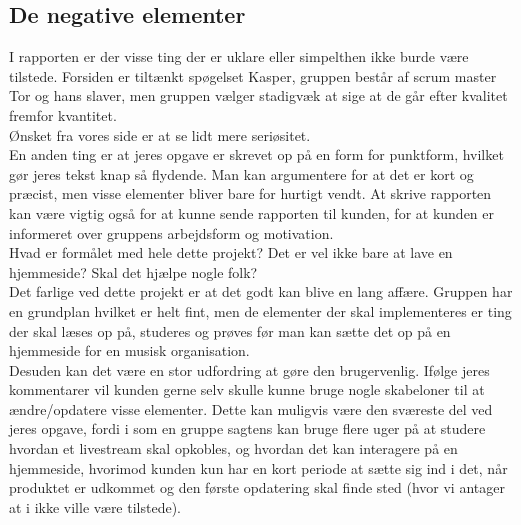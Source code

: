 \documentclass[a4paper]{article}
\begin{document}
\subsection{De negative elementer}
I rapporten er der visse ting der er uklare eller simpelthen ikke burde være tilstede. Forsiden er tiltænkt spøgelset Kasper, gruppen består af scrum master Tor og hans slaver, men gruppen vælger stadigvæk at sige at de går efter kvalitet fremfor kvantitet.\\
Ønsket fra vores side er at se lidt mere seriøsitet. 
\\
En anden ting er at jeres opgave er skrevet op på en form for punktform, hvilket gør jeres tekst knap så flydende. Man kan argumentere for at det er kort og præcist, men visse elementer bliver bare for hurtigt vendt. At skrive rapporten kan være vigtig også for at kunne sende rapporten til kunden, for at kunden er informeret over gruppens arbejdsform og motivation. \\
Hvad er formålet med hele dette projekt? Det er vel ikke bare at lave en hjemmeside? Skal det hjælpe nogle folk? 
\\
Det farlige ved dette projekt er at det godt kan blive en lang affære. Gruppen har en grundplan hvilket er helt fint, men de elementer der skal implementeres er ting der skal læses op på, studeres og prøves før man kan sætte det op på en hjemmeside for en musisk organisation. 
\\
Desuden kan det være en stor udfordring at gøre den brugervenlig. Ifølge jeres kommentarer vil kunden gerne selv skulle kunne bruge nogle skabeloner til at ændre/opdatere visse elementer. Dette kan muligvis være den sværeste del ved jeres opgave, fordi i som en gruppe sagtens kan bruge flere uger på at studere hvordan et livestream skal opkobles, og hvordan det kan interagere på en hjemmeside, hvorimod kunden kun har en kort periode at sætte sig ind i det, når produktet er udkommet og den første opdatering skal finde sted (hvor vi antager at i ikke ville være tilstede).
\end{document}
